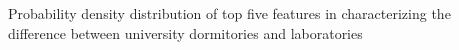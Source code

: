 Probability density distribution of top five features in characterizing the difference between university dormitories and laboratories
\label{fig:topfivefeatures_dormvslab}
